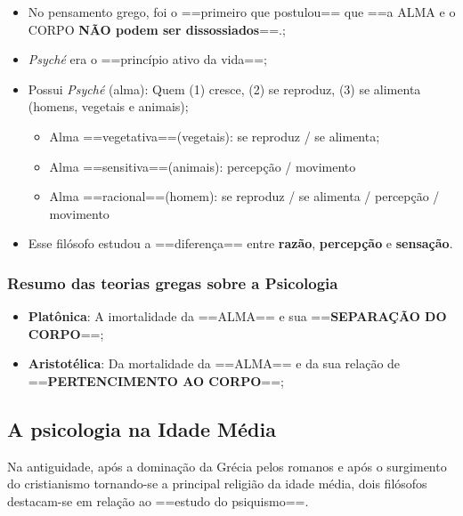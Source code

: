 \documentclass[
]{book}
\providecommand{\tightlist}{%
  \setlength{\itemsep}{0pt}\setlength{\parskip}{0pt}}
\theoremstyle{definition}
\theoremstyle{definition}
\theoremstyle{definition}
\theoremstyle{definition}
\theoremstyle{remark}
\begin{document}
\begin{itemize}
\tightlist
\item
  No pensamento grego, foi o ==primeiro que postulou== que ==a ALMA e o CORPO \textbf{NÃO podem ser dissossiados}==.;
\item
  \emph{Psyché} era o ==princípio ativo da vida==;
\item
  Possui \emph{Psyché} (alma): Quem (1) cresce, (2) se reproduz, (3) se alimenta (homens, vegetais e animais);

  \begin{itemize}
  \tightlist
  \item
    Alma ==vegetativa==(vegetais): se reproduz / se alimenta;
  \item
    Alma ==sensitiva==(animais): percepção / movimento
  \item
    Alma ==racional==(homem): se reproduz / se alimenta / percepção / movimento
  \end{itemize}
\item
  Esse filósofo estudou a ==diferença== entre \textbf{razão}, \textbf{percepção} e \textbf{sensação}.
\end{itemize}

\hypertarget{resumo-das-teorias-gregas-sobre-a-psicologia}{%
\subsubsection{Resumo das teorias gregas sobre a Psicologia}\label{resumo-das-teorias-gregas-sobre-a-psicologia}}

\begin{itemize}
\tightlist
\item
  \textbf{Platônica}: A imortalidade da ==ALMA== e sua ==\textbf{SEPARAÇÃO DO CORPO}==;
\item
  \textbf{Aristotélica}: Da mortalidade da ==ALMA== e da sua relação de ==\textbf{PERTENCIMENTO AO CORPO}==;
\end{itemize}

\hypertarget{a-psicologia-na-idade-muxe9dia}{%
\subsection{A psicologia na Idade Média}\label{a-psicologia-na-idade-muxe9dia}}

Na antiguidade, após a dominação da Grécia pelos romanos e após o surgimento do cristianismo tornando-se a principal religião da idade média, dois filósofos destacam-se em relação ao ==estudo do psiquismo==.
\end{document}
